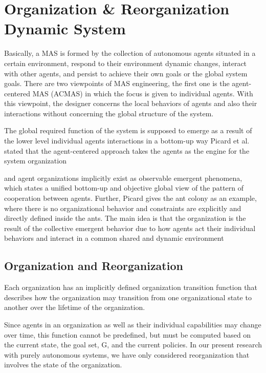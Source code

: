 \section{ Organization \& Reorganization Dynamic System}
 
Basically, a MAS is formed by the collection of  autonomous agents situated in a certain environment, respond
to their environment dynamic changes, interact with other agents, and persist to achieve their own goals or the global
system goals. There are two viewpoints of MAS engineering, the first one is the agent-centered MAS (ACMAS) in which
the focus is given to individual agents. With this viewpoint, the designer concerns the local behaviors of agents and also
their interactions without concerning the global structure of the system. \cite{omacs3}

The global required function of the system is supposed to emerge as a result of the lower level individual
agents interactions in a bottom-up way Picard et al.  stated that the agent-centered approach takes the agents as the engine  for the system organization  \cite{omacs3}

and agent organizations implicitly exist as observable emergent phenomena, which states a unified bottom-up and
objective global view of the pattern of cooperation between agents. Further, Picard gives the ant colony as an example, where there is no organizational behavior and constraints are explicitly and directly defined inside the ants. The main idea is that the organization is the result of the collective emergent
behavior due to how agents act their individual behaviors and interact in a common shared and dynamic environment \cite{omacs3}


\subsection{ Organization and Reorganization }
Each organization has an implicitly defined organization transition function 
that describes how the organization may transition from one organizational state 
to another over the lifetime of the organization.  \cite{omacs2}
	
Since agents in an organization as well as their individual capabilities may change over time, 
this function cannot be predefined, but must be computed based on the current state, 
the goal set, G, and the current policies. In our present research with purely autonomous systems, we have only considered reorganization that involves the state of the organization. 

